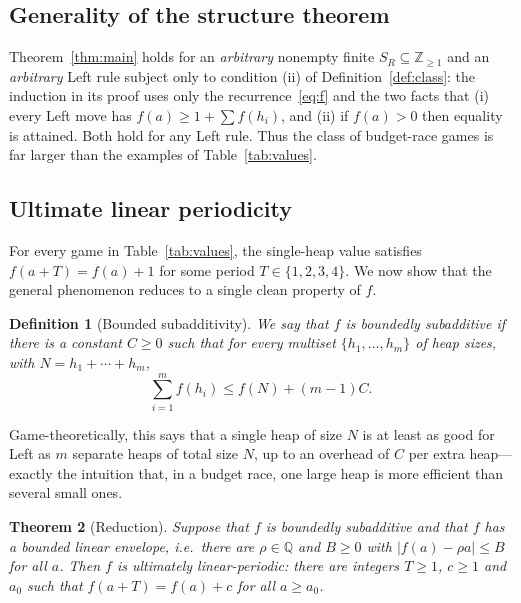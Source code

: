 \documentclass[11pt]{article}
\newtheorem{theorem}{Theorem}[section]
\newtheorem{definition}[theorem]{Definition}
\begin{document}
\subsection{Generality of the structure theorem}

Theorem~\ref{thm:main} holds for an \emph{arbitrary} nonempty finite $S_R\subseteq
\mathbb{Z}_{\ge1}$ and an \emph{arbitrary} Left rule subject only to condition (ii) of
Definition~\ref{def:class}: the induction in its proof uses only the recurrence~\eqref{eq:f}
and the two facts that (i) every Left move has $f(a)\ge 1+\sum f(h_i)$, and (ii) if $f(a)>0$
then equality is attained. Both hold for any Left rule. Thus the class of budget-race games
is far larger than the examples of Table~\ref{tab:values}.

\subsection{Ultimate linear periodicity}

For every game in Table~\ref{tab:values}, the single-heap value satisfies
$f(a+T)=f(a)+1$ for some period $T\in\{1,2,3,4\}$. We now show that the general phenomenon
reduces to a single clean property of $f$.

\begin{definition}[Bounded subadditivity]\label{def:subadd}
We say that $f$ is \emph{boundedly subadditive} if there is a constant $C\ge0$ such that for
every multiset $\{h_1,\dots,h_m\}$ of heap sizes, with $N=h_1+\cdots+h_m$,
\[
\sum_{i=1}^m f(h_i)\le f(N)+(m-1)C .
\]
\end{definition}

Game-theoretically, this says that a single heap of size $N$ is at least as good for Left as
$m$ separate heaps of total size $N$, up to an overhead of $C$ per extra heap---exactly the
intuition that, in a budget race, one large heap is more efficient than several small ones.

\begin{theorem}[Reduction]\label{thm:reduce}
Suppose that $f$ is boundedly subadditive and that $f$ has a bounded linear envelope, i.e.\
there are $\rho\in\mathbb{Q}$ and $B\ge0$ with $|f(a)-\rho a|\le B$ for all $a$. Then $f$ is
ultimately linear-periodic: there are integers $T\ge1$, $c\ge1$ and $a_0$ such that
$f(a+T)=f(a)+c$ for all $a\ge a_0$.
\end{theorem}
\end{document}
